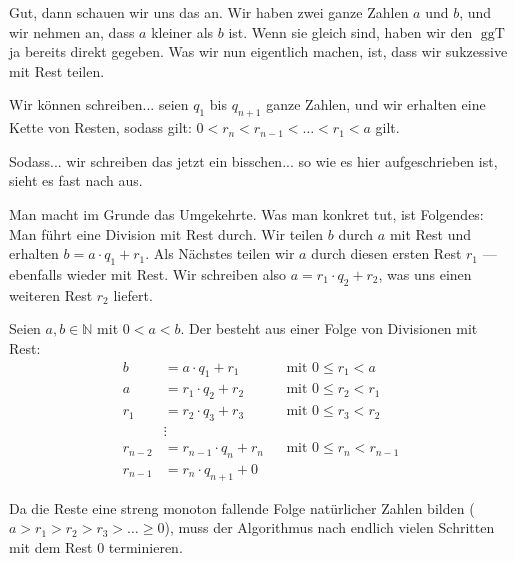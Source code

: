 \begin{spoken-clean}[00:28:29 - 00:29:45]
Gut, dann schauen wir uns das an. Wir haben zwei ganze Zahlen $a$ und $b$, und wir nehmen an, dass $a$ kleiner als $b$ ist. Wenn sie gleich sind, haben wir den $\operatorname{ggT}$ ja bereits direkt gegeben. Was wir nun eigentlich machen, ist, dass wir sukzessive mit Rest teilen.

Wir können schreiben... seien $q_1$ bis $q_{n+1}$ ganze Zahlen, und wir erhalten eine Kette von Resten, sodass gilt: $0 < r_n < r_{n-1} < \dots < r_1 < a$ gilt.
\end{spoken-clean}

\begin{spoken-clean}[00:29:45 - 00:31:04]
Sodass... wir schreiben das jetzt ein bisschen... so wie es hier aufgeschrieben ist, sieht es fast nach  aus.

Man macht im Grunde das Umgekehrte. Was man konkret tut, ist Folgendes: Man führt eine Division mit Rest durch. Wir teilen $b$ durch $a$ mit Rest und erhalten $b = a \cdot q_1 + r_1$. Als Nächstes teilen wir $a$ durch diesen ersten Rest $r_1$ --- ebenfalls wieder mit Rest. Wir schreiben also $a = r_1 \cdot q_2 + r_2$, was uns einen weiteren Rest $r_2$ liefert.
\end{spoken-clean}

\begin{math-stroke}
Seien $a, b \in \mathbb{N}$ mit $0 < a < b$. Der  besteht aus einer Folge von Divisionen mit Rest:
\begin{align}
b &= a \cdot q_1 + r_1 && \text{mit } 0 \le r_1 < a \label{eq:euclid-step1} \\
a &= r_1 \cdot q_2 + r_2 && \text{mit } 0 \le r_2 < r_1 \label{eq:euclid-step2} \\
r_1 &= r_2 \cdot q_3 + r_3 && \text{mit } 0 \le r_3 < r_2 \label{eq:euclid-step3} \\
&\vdots \nonumber \\
r_{n-2} &= r_{n-1} \cdot q_n + r_n && \text{mit } 0 \le r_n < r_{n-1} \label{eq:euclid-step-n} \\
r_{n-1} &= r_n \cdot q_{n+1} + 0 \label{eq:euclid-step-final}
\end{align}

\begin{explanation-of-steps}
Da die Reste eine streng monoton fallende Folge natürlicher Zahlen bilden ($a > r_1 > r_2 > r_3 > \dots \ge 0$), muss der Algorithmus nach endlich vielen Schritten mit dem Rest $0$ terminieren.
\end{explanation-of-steps}
\end{math-stroke}

